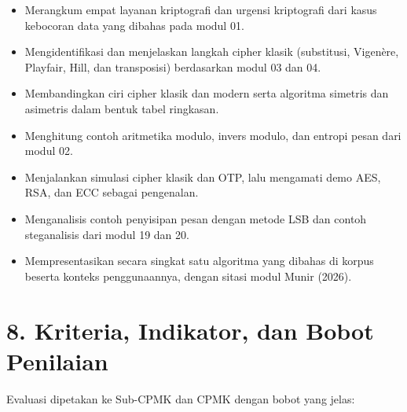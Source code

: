 \documentclass[12pt,a4paper]{article}
\begin{document}
\begin{itemize}[leftmargin=*]
  \item Merangkum empat layanan kriptografi dan urgensi kriptografi dari kasus kebocoran data yang dibahas pada modul 01.
  \item Mengidentifikasi dan menjelaskan langkah cipher klasik (substitusi, Vigen\`{e}re, Playfair, Hill, dan transposisi) berdasarkan modul 03 dan 04.
  \item Membandingkan ciri cipher klasik dan modern serta algoritma simetris dan asimetris dalam bentuk tabel ringkasan.
  \item Menghitung contoh aritmetika modulo, invers modulo, dan entropi pesan dari modul 02.
  \item Menjalankan simulasi cipher klasik dan OTP, lalu mengamati demo AES, RSA, dan ECC sebagai pengenalan.
  \item Menganalisis contoh penyisipan pesan dengan metode LSB dan contoh steganalisis dari modul 19 dan 20.
  \item Mempresentasikan secara singkat satu algoritma yang dibahas di korpus beserta konteks penggunaannya, dengan sitasi modul Munir (2026).
\end{itemize}

\vspace{0.5cm}

\section*{8. Kriteria, Indikator, dan Bobot Penilaian}

Evaluasi dipetakan ke Sub-CPMK dan CPMK dengan bobot yang jelas:
\end{document}
